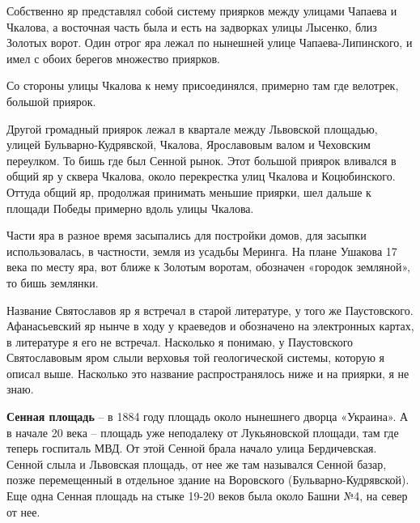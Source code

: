 Собственно яр представлял собой систему приярков между улицами Чапаева и Чкалова, а восточная часть была и есть на задворках улицы Лысенко, близ Золотых ворот. Один отрог яра лежал по нынешней улице Чапаева-Липинского, и имел с обоих берегов множество приярков. 

Со стороны улицы Чкалова к нему присоединялся, примерно там где велотрек, большой приярок. 

Другой громадный приярок лежал в квартале между Львовской площадью, улицей Бульв\-арно-Кудрявской, Чкалова, Ярославовым валом и Чеховским переулком. То бишь где был Сенной рынок. Этот большой приярок вливался в общий яр у сквера Чкалова, около перекрестка улиц Чкалова и Коцюбинского. Оттуда общий яр, продолжая принимать меньшие приярки, шел дальше к площади Победы примерно вдоль улицы Чкалова.

Части яра в разное время засыпались для постройки домов, для засыпки использовалась, в частности, земля из усадьбы Меринга. На плане Ушакова 17 века по месту яра, вот ближе к Золотым воротам, обозначен «городок земляной», то бишь землянки.  

Название Святославов яр я встречал в старой литературе, у того же Паустовского. Афанасьевский яр нынче в ходу у краеведов и обозначено на электронных картах, в литературе я его не встречал. Насколько я понимаю, у Паустовского Святославовым яром слыли верховья той геологической системы, которую я описал выше. Насколько это название распространялось ниже и на приярки, я не знаю.\\

\medskip


\textbf{Сенная площадь} – в 1884 году площадь около нынешнего дворца «Украина». А в начале 20 века – площадь уже неподалеку от Лукьяновской площади, там где теперь госпиталь МВД. От этой Сенной брала начало улица Бердичевская. Сенной слыла и Львовская площадь, от нее же там назывался Сенной базар, позже перемещенный в отдельное здание на Воровского (Бульварно-Кудрявской). Еще одна Сенная площадь на стыке 19-20 веков была около Башни №4, на север от нее.\\ 

\medskip

